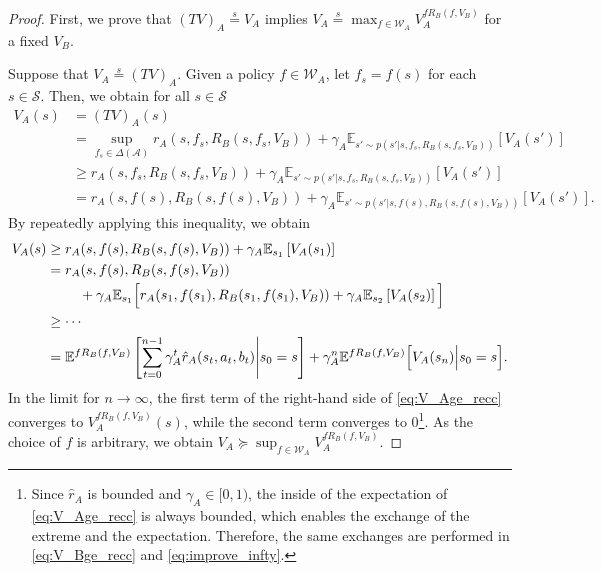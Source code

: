 \documentclass{acml}
\providecommand{\E}{\mathbb{E}} %
\providecommand{\eqs}{\stackrel{s}{=}}
\begin{document}
\begin{proof}
	First, we prove that $(TV)_A \eqs V_A$ implies $V_A \eqs \max_{f\in\mathcal{W}_A} V_A^{fR_B(f,V_B)}$ for a fixed $V_B$.
	
	Suppose that $V_A \eqs (TV)_A$.
	Given a policy $f \in \mathcal{W}_A$, let $f_s = f(s)$ for each $s \in \mathcal{S}$.
	Then, we obtain for all $s \in \mathcal{S}$
	\begin{subequations}
		\begin{align}
			V_A(s) &= (TV)_A(s) \\
			&= \sup_{f_s \in \Delta(\mathcal{A})} r_A(s,f_s,R_B(s,f_s,V_B))+\gamma_A\E_{s'\sim p(s'|s,f_s,R_B(s,f_s,V_B))}\left[V_A(s')\right] \\
			&\ge r_A(s,f_s,R_B(s,f_s,V_B))+\gamma_A\E_{s'\sim p(s'|s,f_s,R_B(s,f_s,V_B))}\left[V_A(s')\right] \\
			&= r_A(s,f(s),R_B(s,f(s),V_B))+\gamma_A\E_{s'\sim p(s'|s,f(s),R_B(s,f(s),V_B))}\left[V_A(s')\right].
		\end{align}
	\end{subequations}
	By repeatedly applying this inequality, we obtain
	\begin{subequations}\label{eq:V_Age_subeq}
		\begin{align}
			V_A(s)
			&\ge r_A(s,f(s),R_B(s,f(s),V_B))+\gamma_A\E_{s_1}\left[V_A(s_1)\right]\\
			&=\begin{multlined}[t]
				r_A(s,f(s),R_B(s,f(s),V_B))\\+\gamma_A\E_{s_1}\Bigl[
				r_A(s_1,f(s_1),R_B(s_1,f(s_1),V_B))+\gamma_A\E_{s_2}\left[V_A(s_2)\right]\Bigl]
			\end{multlined}\\
			&\ge \cdots\nonumber\\
			&=\begin{multlined}[t]
			    \E^{f R_B(f,V_B)}\left[\sum_{t=0}^{n-1}\gamma_A^t\hat{r}_A(s_t,a_t,b_t)\middle| s_0=s\right] 
                    + \gamma_A^n \E^{f R_B(f,V_B)}\Bigl[V_A(s_n)\Bigl| s_0=s\Bigl].
			\end{multlined}\label{eq:V_Age_recc}
		\end{align}
	\end{subequations}
	In the limit for $n\to\infty$, the first term of the right-hand side of \cref{eq:V_Age_recc} converges to $V_A^{f R_B(f,V_B)}(s)$, while the second term converges to 0\footnote{Since $\hat{r}_A$ is bounded and $\gamma_A\in[0,1)$, the inside of the expectation of \cref{eq:V_Age_recc} is always bounded, which enables the exchange of the extreme and the expectation. Therefore, the same exchanges are performed in \cref{eq:V_Bge_recc} and \cref{eq:improve_infty}.}.
	As the choice of $f$ is arbitrary, we obtain $V_A \succcurlyeq \sup_{f \in \mathcal{W}_A} V_A^{f R_B(f,V_B)}$.
	

\end{proof}
\end{document}
